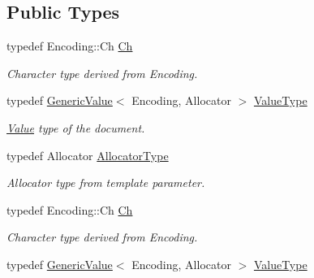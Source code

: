 \subsection*{Public Types}
\begin{DoxyCompactItemize}
\item 
\mbox{\label{classGenericDocument_a6f5b0b7b6626508d094ae67490269700}} 
typedef Encoding\+::\+Ch \hyperlink{classGenericDocument_a6f5b0b7b6626508d094ae67490269700}{Ch}
\begin{DoxyCompactList}\small\item\em Character type derived from Encoding. \end{DoxyCompactList}\item 
\mbox{\label{classGenericDocument_a8936205dc215dda029060d7e835e0549}} 
typedef \hyperlink{classGenericValue}{Generic\+Value}$<$ Encoding, Allocator $>$ \hyperlink{classGenericDocument_a8936205dc215dda029060d7e835e0549}{Value\+Type}
\begin{DoxyCompactList}\small\item\em \hyperlink{classValue}{Value} type of the document. \end{DoxyCompactList}\item 
\mbox{\label{classGenericDocument_a35155b912da66ced38d22e2551364c57}} 
typedef Allocator \hyperlink{classGenericDocument_a35155b912da66ced38d22e2551364c57}{Allocator\+Type}
\begin{DoxyCompactList}\small\item\em Allocator type from template parameter. \end{DoxyCompactList}\item 
\mbox{\label{classGenericDocument_a6f5b0b7b6626508d094ae67490269700}} 
typedef Encoding\+::\+Ch \hyperlink{classGenericDocument_a6f5b0b7b6626508d094ae67490269700}{Ch}
\begin{DoxyCompactList}\small\item\em Character type derived from Encoding. \end{DoxyCompactList}\item 
\mbox{\label{classGenericDocument_a8936205dc215dda029060d7e835e0549}} 
typedef \hyperlink{classGenericValue}{Generic\+Value}$<$ Encoding, Allocator $>$ \hyperlink{classGenericDocument_a8936205dc215dda029060d7e835e0549}{Value\+Type}

\end{DoxyCompactItemize}

